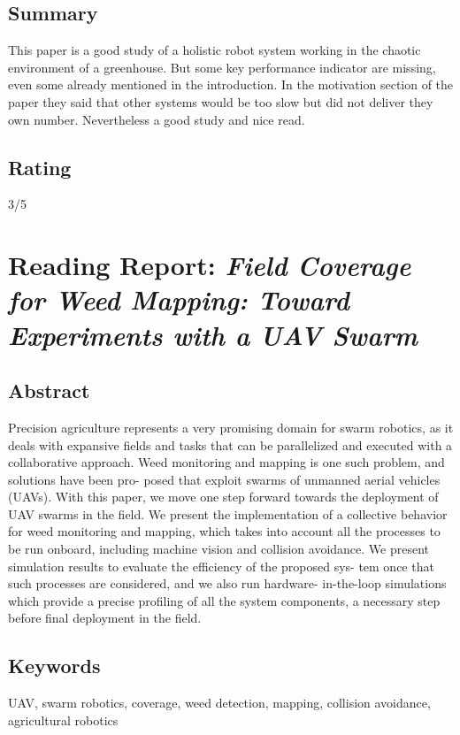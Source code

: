     \subsection*{Summary}
    This paper is a good study of a holistic robot system working in the chaotic environment of a greenhouse. But some key performance indicator are missing, even some already mentioned in the introduction. 
    In the motivation section of the paper they said that other systems would be too slow but did not deliver they own number. Nevertheless a good study and nice read.
    
    \subsection*{Rating}
    3/5

    \newpage
    
    \section{Reading Report: \emph{Field Coverage for Weed Mapping: Toward Experiments with a UAV Swarm}}
    \cite{Albani2019}
    
    \subsection*{Abstract}
    Precision agriculture represents a very promising domain for
    swarm robotics, as it deals with expansive fields and tasks that can be
    parallelized and executed with a collaborative approach. Weed monitoring and mapping is one such problem, and solutions have been pro-
    posed that exploit swarms of unmanned aerial vehicles (UAVs). With this
    paper, we move one step forward towards the deployment of UAV swarms
    in the field. We present the implementation of a collective behavior for
    weed monitoring and mapping, which takes into account all the processes
    to be run onboard, including machine vision and collision avoidance. We
    present simulation results to evaluate the efficiency of the proposed sys-
    tem once that such processes are considered, and we also run hardware-
    in-the-loop simulations which provide a precise profiling of all the system
    components, a necessary step before final deployment in the field.
    
    \subsection*{Keywords}
    UAV, swarm robotics, coverage, weed detection, mapping, collision avoidance, agricultural robotics
    
